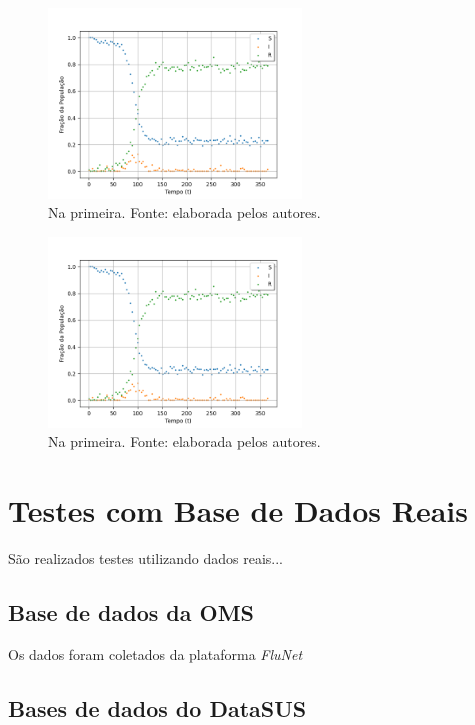 \begin{figure}[htpb]
\centering
\includegraphics[width=0.6\textwidth]{figuras/runge-kutta-compartiments-data-sir-noisy.png}
\caption{Na primeira. Fonte: elaborada pelos autores.}
\label{fig:dados-semruido-pe2}
\end{figure}

\begin{figure}[htpb]
\centering
\includegraphics[width=0.6\textwidth]{figuras/runge-kutta-compartiments-data-sir-noisy.png}
\caption{Na primeira. Fonte: elaborada pelos autores.}
\label{fig:dados-comruido-pe2}
\end{figure}


\section{Testes com Base de Dados Reais}

São realizados testes utilizando dados reais...

\subsection{Base de dados da OMS}

Os dados foram coletados da plataforma \textit{FluNet} \cite{flunet}

\subsection{Bases de dados do DataSUS}

